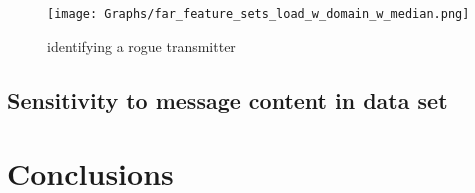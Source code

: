 \documentclass[conference]{IEEEtran}
\begin{document}
  \begin{figure}[t]
    \centering
    \texttt{[image: Graphs/far\_feature\_sets\_load\_w\_domain\_w\_median.png]}
    \caption{identifying a rogue transmitter}
    \label{fig:load_results}
  \end{figure}
  

\subsection{Sensitivity to message content in data set}

\section{Conclusions}


 
\end{document}
